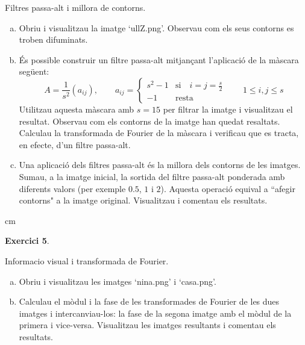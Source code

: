 \documentclass{article}
\begin{document}
Filtres passa-alt i millora de contorns.
\begin{enumerate}[a)]
\item \label{4a} Obriu i visualitzau la imatge `ullZ.png'.
Observau com els seus contorns es troben difuminats.

\item \label{4b} \'Es possible construir un filtre passa-alt
mitjan\c{c}ant l'aplicaci\'o de la m\`ascara seg\"uent:
\[A=\frac{1}{s^2}(a_{ij}), \qquad a_{ij}=
\begin{cases}
s^2-1 & \mathrm{si} \quad  i=j=\frac{s}{2}\\
-1    & \mathrm{resta}
\end{cases}
\qquad 1 \leq i,j \leq s
\]
\noindent Utilitzau aquesta m\`ascara amb $s=15$ per filtrar la
imatge i visualitzau el resultat. Observau com els contorns de la
imatge han quedat resaltats. Calculau la transformada de Fourier
de la m\`ascara i verificau que es tracta, en efecte, d'un filtre
passa-alt.

\item \label{4c} Una aplicaci\'o dels filtres passa-alt \'es la
millora dels contorns de les imatges. Sumau, a la imatge inicial,
la sortida del filtre passa-alt ponderada amb diferents valors
(per exemple $0.5$, $1$ i $2$). Aquesta operaci\'o equival a
``afegir contorns" a la imatge original. Visualitzau i comentau
els resultats.
\end{enumerate}


 cm


\noindent \textbf{Exercici 5}. \label{ex5}
\newline

Informacio visual i transformada de Fourier.
\begin{enumerate}[a)]
\item \label{5a} Obriu i visualitzau les imatges `nina.png' i
`casa.png'.

\item \label{5b} Calculau el m\`odul i la fase de les
transformades de Fourier de les dues imatges i intercanviau-los:
la fase de la segona imatge amb el m\`odul de la primera i
vice-versa. Visualitzau les imatges resultants i comentau els
resultats.
\end{enumerate}
\end{document}

